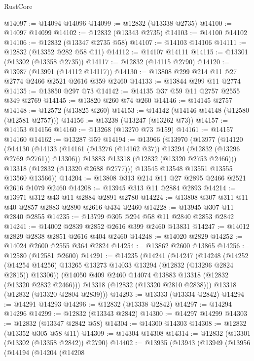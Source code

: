 \begin{lexlean}{RustCore}
\begin{coremodule}
@14097 := @14094 @14096
@14099 := @12832 (@13338 @2735)
@14100 := @14097 @14099
@14102 := @12832 (@13343 @2735)
@14103 := @14100 @14102
@14106 := @12832 (@13347 @2735 @58)
@14107 := @14103 @14106
@14111 := @12832 (@13352 @282 @58 @11)
@14112 := @14107 @14111
@14115 := @13301 (@13302 (@13358 @2735))
@14117 := @12832 (@14115 @2790)
@14120 := @13987 (@13991 (@14112 @14117))
@14130 := @13808 @299 @214 @11 @27 @2774 @2466 @2521 @2616 @359 @2460
@14133 := @13844 @299 @11 @2774
@14135 := @13850 @297 @73
@14142 := @14135 @37 @59 @11 @2757 @2555 @349 @2769
@14145 := @13820 @260 @74 @260
@14146 := @14145 @2757
@14148 := @12572 (@13825 @260)
@14153 := @14142 (@14146 @14148 (@12580 (@12581 @2757)))
@14156 := @13238 (@13247 (@13262 @73))
@14157 := @14153 @14156
@14160 := @13268 (@13270 @73 @159)
@14161 := @14157 @14160
@14162 := @13287 @59
@14194 := @13966
    (@13970
      (@13977
        (@14120
          (@14130
            (@14133 (@14161 (@13276 (@14162 @37)) @13294 (@12832 (@13296 @2769 @2761)) @13306))
            @13883
            @13318
            (@12832 (@13320 @2753 @2466)))
          @13318
          (@12832 (@13320 @2688 @2777)))
        @13545
        @13548
        @13551
        @13555
        @13560
        @13566))
@14204 := @13808 @313 @214 @11 @27 @2895 @2466 @2521 @2616 @1079 @2460
@14208 := @13945 @313 @11 @2884 @2893
@14214 := @13971 @312 @43 @11 @2884 @2891 @2780
@14224 := @13808 @307 @311 @11 @40 @2857 @2883 @2890 @2616 @434 @2460
@14228 := @13945 @307 @11 @2840 @2855
@14235 := @13799 @305 @294 @58 @11 @2840 @2853 @2842
@14241 := @14002 @2839 @2852 @2616 @399 @2460 @13831
@14247 := @14012 @2829 @2838 @2851 @2616 @404 @2460
@14248 := @14020 @2829
@14252 := @14024 @2600 @2555 @364 @2824
@14254 := @13862 @2600 @13865
@14256 := @12580 (@12581 @2600)
@14291 := @14235
    (@14241
      (@14247
        (@14248
          (@14252 (@14254 @14256) @13265 @13273 @14033 @13294 (@12832 (@13296 @2824 @2815)) @13306))
        (@14050 @409 @2460 @14074 @13883 @13318 (@12832 (@13320 @2832 @2466)))
        @13318
        (@12832 (@13320 @2810 @2838)))
      @13318
      (@12832 (@13320 @2804 @2839)))
@14293 := @13333 (@13334 @2842)
@14294 := @14291 @14293
@14296 := @12832 (@13338 @2842)
@14297 := @14294 @14296
@14299 := @12832 (@13343 @2842)
@14300 := @14297 @14299
@14303 := @12832 (@13347 @2842 @58)
@14304 := @14300 @14303
@14308 := @12832 (@13352 @305 @58 @11)
@14309 := @14304 @14308
@14314 := @12832 (@13301 (@13302 (@13358 @2842)) @2790)
@14402 := @13935
    (@13943
      (@13949
        (@13956
          (@14194
            (@14204
              (@14208

\end{coremodule}
\end{lexlean}
